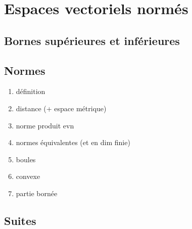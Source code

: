 \section{Espaces vectoriels normés}

\subsection{Bornes supérieures et inférieures}
\subsection{Normes}
\begin{enumerate}
    \item définition
    \item distance (+ espace métrique)
    \item norme produit evn
    \item normes équivalentes (et en dim finie)
    \item boules
    \item convexe
    \item partie bornée
\end{enumerate}

\subsection{Suites}
